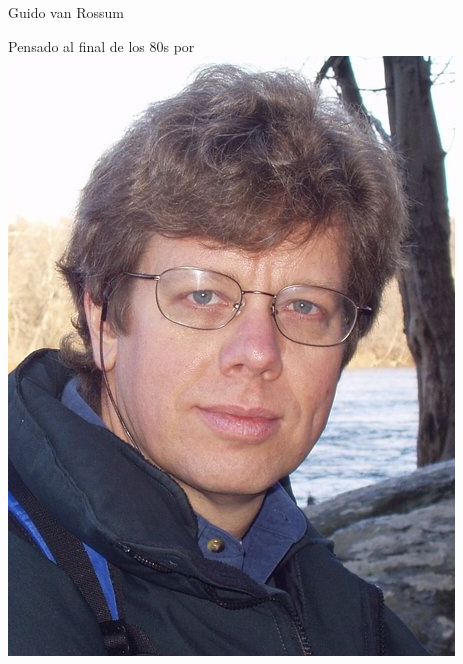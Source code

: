 \documentclass[10pt,colorlinks]{beamer}
\begin{document}
\begin{frame}[fragile]
\begin{columns}[T]
\begin{column}{.3\textwidth}
        \begin{block}{ \centering  Guido van Rossum}
            \begin{center}
                Pensado al final de los 80s por 
                \includegraphics[scale=0.2]{figs/Guido_van_Rossum.jpg}
            \end{center}
        \end{block}
    \end{column}
  \end{columns}
\end{frame}
\end{document}
